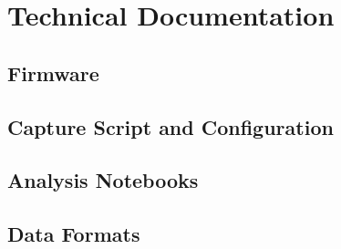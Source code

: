 \setcounter{figure}{0}
\setcounter{listing}{0}

\chapter{Technical Documentation}
\label{appendix:technical}
\renewcommand*{\thepage}{A-\arabic{page}}

\section{Firmware}

\section{Capture Script and Configuration}

\section{Analysis Notebooks}

\section{Data Formats}
